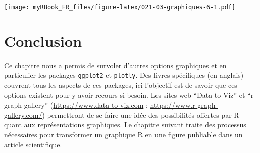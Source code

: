 \documentclass[twoside,symmetric]{book}
\newenvironment{Shaded}{}{}
\newcommand{\ControlFlowTok}[1]{\textbf{#1}}
\newcommand{\DataTypeTok}[1]{\underline{#1}}
\newcommand{\KeywordTok}[1]{\textbf{#1}}
\newcommand{\NormalTok}[1]{#1}
\newcommand{\OperatorTok}[1]{#1}
\newcommand{\OtherTok}[1]{#1}
\newcommand{\StringTok}[1]{#1}
\begin{document}
\begin{Shaded}
\end{Shaded}

\texttt{[image: myRBook\_FR\_files/figure-latex/021-03-graphiques-6-1.pdf]}

\hypertarget{conclusion-10}{%
\section{Conclusion}\label{conclusion-10}}

Ce chapitre nous a permis de survoler d'autres options graphiques et en particulier les packages \texttt{ggplot2} et \texttt{plotly}. Des livres spécifiques (en anglais) couvrent tous les aspects de ces packages, ici l'objectif est de savoir que ces options existent pour y avoir recours si besoin. Les sites web ``Data to Viz'' et ``r-graph gallery'' (\url{https://www.data-to-viz.com} ; \url{https://www.r-graph-gallery.com/}) permettront de se faire une idée des possibilités offertes par R quant aux représentations graphiques. Le chapitre suivant traite des processus nécessaires pour transformer un graphique R en une figure publiable dans un article scientifique.
\end{document}
